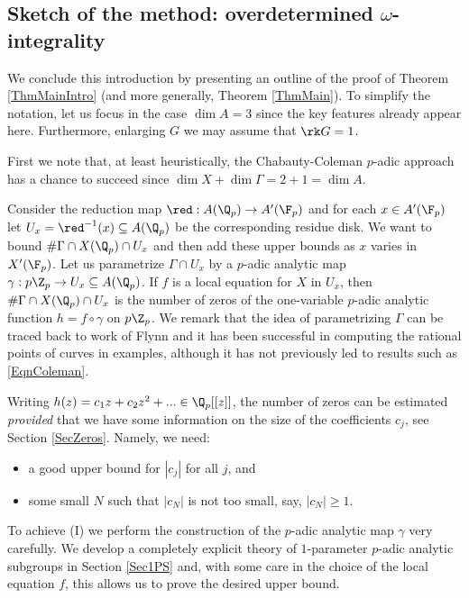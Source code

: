 
\subsection{Sketch of the method: overdetermined $\omega$-integrality}\label{SecIntroMethods} We conclude this introduction by presenting an outline of the proof of Theorem \ref{ThmMainIntro} (and more generally, Theorem \ref{ThmMain}). To simplify the notation, let us focus in the case $\dim A=3$ since the key features already appear here. Furthermore, enlarging $G$ we may assume that $\rk G=1$.

First we note that, at least heuristically, the Chabauty-Coleman $p$-adic approach has a chance to succeed since $\dim X+ \dim \Gamma= 2+1=\dim A$.



Consider the reduction map $\red:A(\Q_p)\to A'(\F_p)$ and for each $x\in A'(\F_p)$ let  $U_x=\red^{-1}(x)\subseteq A(\Q_p)$ be the corresponding residue disk. We want to bound $\# \Gamma\cap X(\Q_p)\cap U_x$ and then add these upper bounds as $x$ varies in $X'(\F_p)$. Let us parametrize $\Gamma\cap U_x$ by a $p$-adic analytic map $\gamma : p\Z_p\to U_x\subseteq A(\Q_p)$. If $f$ is a local equation for $X$ in $U_x$, then $\#\Gamma\cap X(\Q_p)\cap U_x$ is the number of zeros of the one-variable $p$-adic analytic function $h=f\circ \gamma$ on $p\Z_p$. We remark that the idea of parametrizing $\Gamma$ can be traced back to work of Flynn \cite{Flyn} and it has been successful in computing the rational points of curves in examples, although it has not previously led to results such as \eqref{EqnColeman}.


Writing $h(z)=c_1z+c_2z^2+...\in \Q_p[[z]]$, the number of zeros can be estimated  \emph{provided} that we have some information on the size of the coefficients $c_j$, see Section \ref{SecZeros}. Namely,  we need:
\begin{itemize}
\item[(I)] a good upper bound for $|c_j|$ for all $j$, and
\item[(II)] some small $N$ such that $|c_N|$ is not too small, say, $|c_N|\ge 1$.
\end{itemize}
To achieve (I) we perform the construction of the $p$-adic analytic map $\gamma$ very carefully. We develop a completely explicit theory of $1$-parameter $p$-adic analytic subgroups in Section \ref{Sec1PS} and, with some care in the choice of the local equation $f$, this allows us to prove the desired upper bound.

